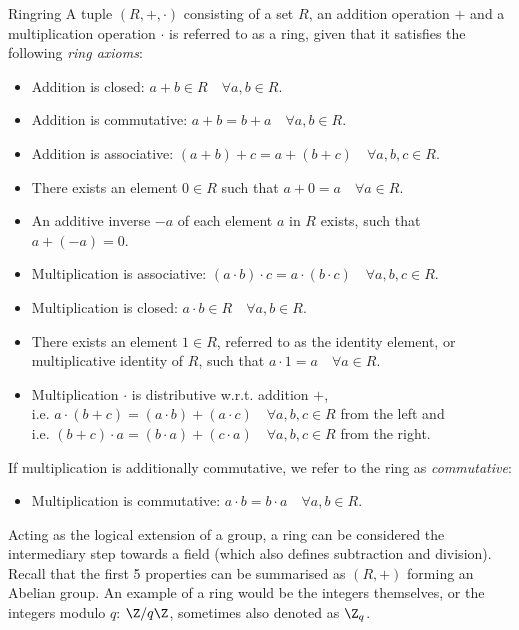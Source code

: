 \begin{definition}{Ring}{ring}
  A tuple $(R, +, \cdot)$ consisting of a set $R$, an addition operation $+$ and a multiplication operation $\cdot$
  is referred to as a ring, given that it satisfies the following \textit{ring axioms}:
  \begin{itemize}
    \item Addition is closed: $a + b \in R \quad\forall a, b \in R$.
    \item Addition is commutative: $a + b = b + a \quad\forall a, b \in R$.
    \item Addition is associative: $(a + b) + c = a + (b + c) \quad\forall a, b, c \in R$.
    \item There exists an element $0 \in R$ such that $a + 0 = a \quad\forall a \in R$.
    \item An additive inverse $-a$ of each element $a$ in $R$ exists, such that $a + (-a) = 0$.
    \item Multiplication is associative: $(a \cdot b) \cdot c = a \cdot (b \cdot c) \quad\forall a, b, c \in R$.
    \item Multiplication is closed: $a \cdot b \in R \quad\forall a, b \in R$.
    \item There exists an element $1 \in R$, referred to as the identity element, or multiplicative identity of $R$,
          such that $a \cdot 1 = a \quad\forall a \in R$.
    \item Multiplication $\cdot$ is distributive w.r.t. addition $+$, \\
          i.e. $a \cdot (b+c) = (a \cdot b) + (a \cdot c) \quad\forall a, b, c \in R$ from the left and \\
          i.e. $(b+c) \cdot a = (b \cdot a) + (c \cdot a) \quad\forall a, b, c \in R$ from the right.
  \end{itemize}
  If multiplication is additionally commutative, we refer to the ring as \textit{commutative}:
  \begin{itemize}
    \item Multiplication is commutative: $a \cdot b = b \cdot a \quad\forall a, b \in R$.
  \end{itemize}
\end{definition}

Acting as the logical extension of a group, a ring can be considered the intermediary step towards a field (which also defines subtraction and division).
Recall that the first 5 properties can be summarised as $(R, +)$ forming an Abelian group.
An example of a ring would be the integers themselves, or the integers modulo $q$: $\Z / q \Z$, sometimes also denoted as $\Z_q$.

